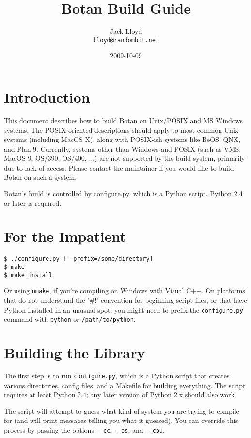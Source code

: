 \documentclass{article}
\title{\textbf{Botan Build Guide}}
\author{Jack Lloyd \\
        \texttt{lloyd@randombit.net}}
\date{2009-10-09}
\newcommand{\filename}[1]{\texttt{#1}}
\begin{document}
\maketitle

\tableofcontents

\parskip=5pt
\pagebreak

\section{Introduction}

This document describes how to build Botan on Unix/POSIX and MS
Windows systems. The POSIX oriented descriptions should apply to most
common Unix systems (including MacOS X), along with POSIX-ish systems
like BeOS, QNX, and Plan 9. Currently, systems other than Windows and
POSIX (such as VMS, MacOS 9, OS/390, OS/400, ...) are not supported by
the build system, primarily due to lack of access. Please contact the
maintainer if you would like to build Botan on such a system.

Botan's build is controlled by configure.py, which is a Python
script. Python 2.4 or later is required.

\section{For the Impatient}

\begin{verbatim}
$ ./configure.py [--prefix=/some/directory]
$ make
$ make install
\end{verbatim}

Or using \verb|nmake|, if you're compiling on Windows with Visual
C++. On platforms that do not understand the '\#!' convention for
beginning script files, or that have Python installed in an unusual
spot, you might need to prefix the \texttt{configure.py} command with
\texttt{python} or \texttt{/path/to/python}.

\section{Building the Library}

The first step is to run \filename{configure.py}, which is a Python
script that creates various directories, config files, and a Makefile
for building everything. The script requires at least Python 2.4; any
later version of Python 2.x should also work.

The script will attempt to guess what kind of system you are trying
to compile for (and will print messages telling you what it guessed).
You can override this process by passing the options \verb|--cc|,
\verb|--os|, and \verb|--cpu|.
\end{document}
